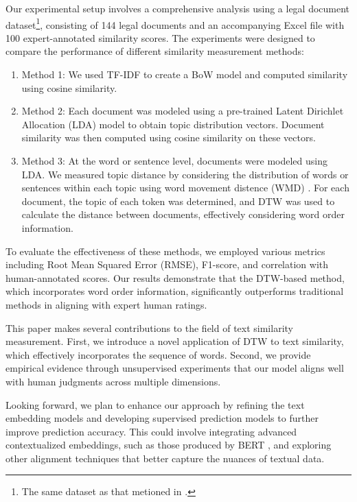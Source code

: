 \documentclass[UTF8]{ctexart}
\begin{document}
{  Our experimental setup involves a comprehensive analysis using a legal document dataset\footnote{The same dataset as that metioned in \cite{ref3}.}, consisting of 144 legal documents and an accompanying Excel file with 100 expert-annotated similarity scores. The experiments were designed to compare the performance of different similarity measurement methods:

    \newpage

  \begin{enumerate}
      \item Method 1: We used TF-IDF \cite{ref4} to create a BoW model and computed similarity using cosine similarity.
      \item Method 2: Each document was modeled using a pre-trained Latent Dirichlet Allocation (LDA) \cite{ref5} model to obtain topic distribution vectors. Document similarity was then computed using cosine similarity on these vectors.
      \item Method 3: At the word or sentence level, documents were modeled using LDA. We measured topic distance by considering the distribution of words or sentences within each topic using word movement distence (WMD) \cite{ref6}. For each document, the topic of each token was determined, and DTW was used to calculate the distance between documents, effectively considering word order information.
  \end{enumerate}

  To evaluate the effectiveness of these methods, we employed various metrics including Root Mean Squared Error (RMSE), F1-score, and correlation with human-annotated scores. Our results demonstrate that the DTW-based method, which incorporates word order information, significantly outperforms traditional methods in aligning with expert human ratings.

  This paper makes several contributions to the field of text similarity measurement. First, we introduce a novel application of DTW to text similarity, which effectively incorporates the sequence of words. Second, we provide empirical evidence through unsupervised experiments that our model aligns well with human judgments across multiple dimensions.

  Looking forward, we plan to enhance our approach by refining the text embedding models and developing supervised prediction models to further improve prediction accuracy. This could involve integrating advanced contextualized embeddings, such as those produced by BERT \cite{ref7}, and exploring other alignment techniques that better capture the nuances of textual data.
 }
\end{document}
